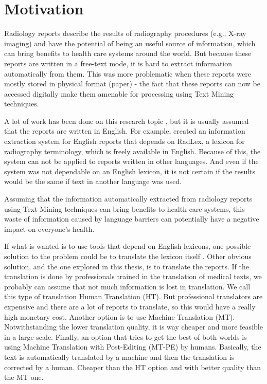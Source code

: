 \label{chap1}

\section{Motivation}
\label{motivation}

Radiology reports describe the results of radiography procedures (e.g., X-ray imaging) and have the potential of being an useful source of information, which can bring benefits to health care systems around the world. But because these reports are written in a free-text mode, it is hard to extract information automatically from them. This was more problematic when these reports were mostly stored in physical format (paper) - the fact that these reports can now be accessed digitally make them amenable for processing using Text Mining techniques. 

A lot of work has been done on this research topic \citep{Pons2016}, but it is usually assumed that the reports are written in English. For example, \citep{Hassanpour2016} created an information extraction system for English reports that depends on RadLex, a lexicon for radiography terminology, which is freely available in English. Because of this, the system can not be applied to reports written in other languages. And even if the system was not dependable on an English lexicon, it is not certain if the results would be the same if text in another language was used.

Assuming that the information automatically extracted from radiology reports using Text Mining techniques can bring benefits to health care systems, this waste of information caused by language barriers can potentially have a negative impact on everyone's health.

If what is wanted is to use tools that depend on English lexicons, one possible solution to the problem could be to translate the lexicon itself \citep{Bretschneider}. Other obvious solution, and the one explored in this thesis, is to translate the reports. If the translation is done by professionals trained in the translation of medical texts, we probably can assume that not much information is lost in translation. We call this type of translation Human Translation (HT). But professional translators are expensive and there are a lot of reports to translate, so this would have a really high monetary cost. Another option is to use Machine Translation (MT). Notwithstanding the lower translation quality, it is way cheaper and more feasible in a large scale. Finally, an option that tries to get the best of both worlds is using Machine Translation with Post-Editing (MT-PE) by humans. Basically, the text is automatically translated by a machine and then the translation is corrected by a human. Cheaper than the HT option and with better quality than the MT one. 

